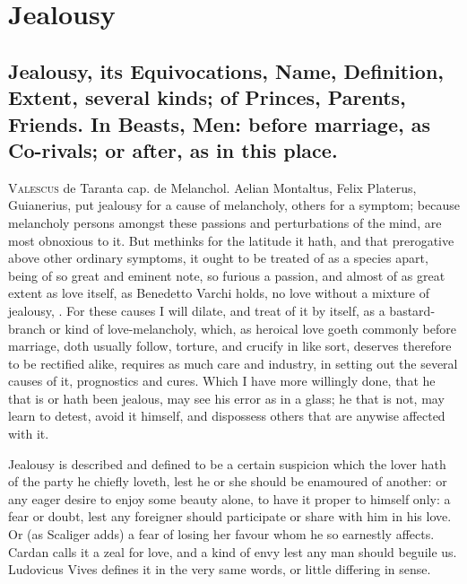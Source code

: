 \chapter{Jealousy}

\section[Jealousy, its Equivocations, Name, Definition\ldots{}]{Jealousy, its Equivocations, Name, Definition, Extent, several kinds; of Princes, Parents, Friends. In Beasts, Men: before marriage, as Co-rivals; or after, as in this place.}

\lettrine{V}{alescus} de Taranta cap. de Melanchol. Aelian Montaltus, Felix
Platerus, Guianerius, put jealousy for a cause of melancholy, others
for a symptom; because melancholy persons amongst these passions and
perturbations of the mind, are most obnoxious to it. But methinks for
the latitude it hath, and that prerogative above other ordinary
symptoms, it ought to be treated of as a species apart, being of so
great and eminent note, so furious a passion, and almost of as great
extent as love itself, as Benedetto Varchi holds, no love without
a mixture of jealousy, . For these causes I will
dilate, and treat of it by itself, as a bastard-branch or kind of
love-melancholy, which, as heroical love goeth commonly before
marriage, doth usually follow, torture, and crucify in like sort,
deserves therefore to be rectified alike, requires as much care and
industry, in setting out the several causes of it, prognostics and
cures. Which I have more willingly done, that he that is or hath been
jealous, may see his error as in a glass; he that is not, may learn to
detest, avoid it himself, and dispossess others that are anywise
affected with it.

Jealousy is described and defined to be a certain suspicion which
the lover hath of the party he chiefly loveth, lest he or she should be
enamoured of another: or any eager desire to enjoy some beauty alone,
to have it proper to himself only: a fear or doubt, lest any foreigner
should participate or share with him in his love. Or (as Scaliger
adds) a fear of losing her favour whom he so earnestly affects. Cardan
calls it a zeal for love, and a kind of envy lest any man should
beguile us. Ludovicus Vives defines it in the very same words, or
little differing in sense.

